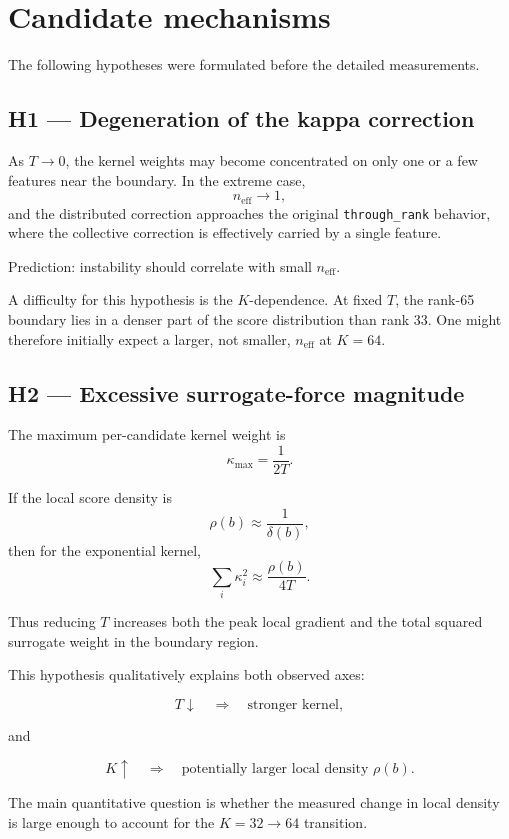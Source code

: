 \documentclass[11pt,a4paper]{article}
\newcommand{\code}[1]{\texttt{#1}}
\newcommand{\neff}{n_{\mathrm{eff}}}
\begin{document}
\section{Candidate mechanisms}

The following hypotheses were formulated before the detailed measurements.

\subsection*{H1 --- Degeneration of the kappa correction}

As \(T\to0\), the kernel weights may become concentrated on only one or a few
features near the boundary. In the extreme case,
\[
\neff\to1,
\]
and the distributed correction approaches the original
\code{through\_rank} behavior, where the collective correction is effectively
carried by a single feature.

Prediction:
instability should correlate with small \(\neff\).

A difficulty for this hypothesis is the \(K\)-dependence.
At fixed \(T\), the rank-65 boundary lies in a denser part of the score
distribution than rank 33. One might therefore initially expect a larger,
not smaller, \(\neff\) at \(K=64\).

\subsection*{H2 --- Excessive surrogate-force magnitude}

The maximum per-candidate kernel weight is
\[
\kappa_{\max}
=
\frac{1}{2T}.
\]

If the local score density is
\[
\rho(b)\approx\frac{1}{\delta(b)},
\]
then for the exponential kernel,
\[
\sum_i \kappa_i^2
\approx
\frac{\rho(b)}{4T}.
\]

Thus reducing \(T\) increases both the peak local gradient and the total
squared surrogate weight in the boundary region.

This hypothesis qualitatively explains both observed axes:

\[
T\downarrow
\quad\Rightarrow\quad
\text{stronger kernel},
\]

and

\[
K\uparrow
\quad\Rightarrow\quad
\text{potentially larger local density } \rho(b).
\]

The main quantitative question is whether the measured change in local density
is large enough to account for the \(K=32\to64\) transition.
\end{document}
